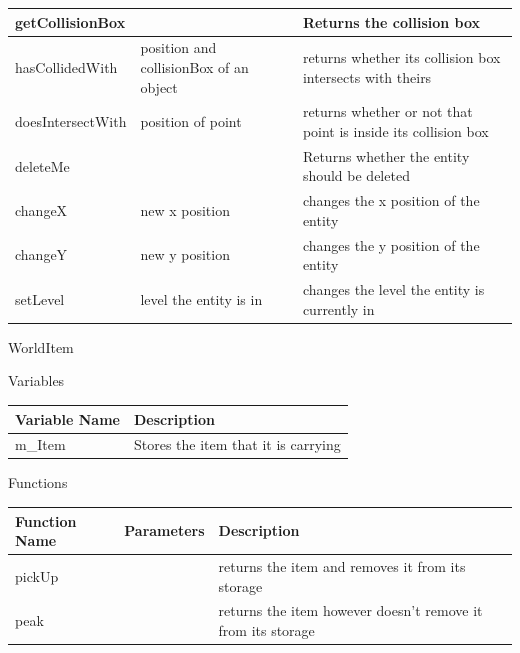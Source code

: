 \documentclass{article}
\begin{document}
\begin{center}
\begin{tabular}{ | m{} | m{}| m{} | }
                        \hline
                        getCollisionBox & & Returns the collision box \\
                        \hline
                        hasCollidedWith & position and collisionBox of an object & returns whether its collision box intersects with theirs \\
                        \hline
                        doesIntersectWith & position of point & returns whether or not that point is inside its collision box \\
                        \hline
                        deleteMe & & Returns whether the entity should be deleted \\
                        \hline
                        changeX & new x position & changes the x position of the entity \\
                        \hline
                        changeY & new y position & changes the y position of the entity \\
                        \hline
                        setLevel & level the entity is in & changes the level the entity is currently in \\
                        \hline
                    \end{tabular}
                \end{center}
                WorldItem
                \begin{center}
                    Variables
                    \begin{tabular}{ | m{} | m{} | }
                        \hline
                        \textbf{Variable Name} & \textbf{Description} \\
                        \hline
                        m\_Item & Stores the item that it is carrying \\
                        \hline
                    \end{tabular}
                    Functions
                    \begin{tabular}{ | m{} | m{}| m{} | }
                        \hline
                        \textbf{Function Name} & \textbf{Parameters} & \textbf{Description} \\
                        \hline
                        pickUp & & returns the item and removes it from its storage \\
                        \hline
                        peak & & returns the item however doesn't remove it from its storage \\
                        \hline
                    \end{tabular}
                \end{center}
\end{document}
